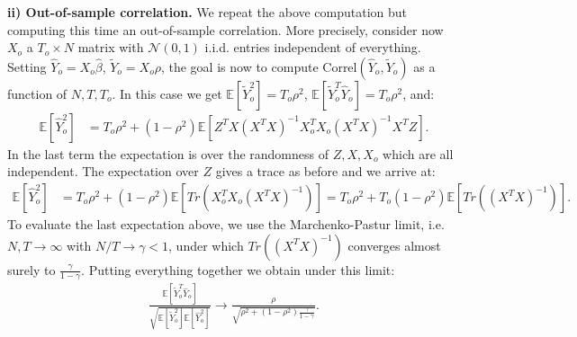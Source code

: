 \documentclass{article}
\begin{document}
\vspace{\baselineskip}
\noindent
\textbf{ii) Out-of-sample correlation.} We repeat the above computation but computing this time an out-of-sample correlation. More precisely, consider now $X_o$ a $T_o \times N$ matrix with $\mathcal{N}(0,1)$ i.i.d. entries independent of everything. Setting $\widehat Y_o = X_o \widehat \beta$, $\widetilde Y_o = X_o \rho$, the goal is now to compute $\text{Correl}(\widehat Y_o, \widetilde Y_o)$ as a function of $N, T, T_o$. In this case we get $\mathbb{E}[\widetilde Y_o^2] = T_o \rho^2$, $\mathbb{E}[\widetilde Y_o ^T \widehat Y_o] = T_o \rho^2$, and:
\begin{align*}
\mathbb{E}[ \widehat Y_o ^2] &= T_o \rho^2 + (1 - \rho^2)  \mathbb{E}[Z^T X (X^T X)^{-1} X^T_o X_o (X^T X)^{-1} X^T Z].
\end{align*}
In the last term the expectation is over the randomness of $Z, X, X_o$ which are all independent. The expectation over $Z$ gives a trace as before and we arrive at:
\begin{align*}
\mathbb{E}[ \widehat Y_o ^2] &= T_o \rho^2 + (1 - \rho^2)  \mathbb{E}[Tr(X^T_o X_o (X^T X)^{-1})] = T_o \rho^2 + T_o (1 - \rho^2)  \mathbb{E}[Tr((X^T X)^{-1})].
\end{align*}
To evaluate the last expectation above, we use the Marchenko-Pastur limit, i.e. $N, T \rightarrow \infty$ with $N/T \rightarrow \gamma < 1$, under which $Tr((X^T X)^{-1})$ converges almost surely to $\frac{\gamma}{1 - \gamma}$. Putting everything together we obtain under this limit:
\begin{align}\label{theo_correl_oos}
\frac{\mathbb{E}[\widetilde Y_o ^T \widehat Y_o]}{\sqrt{\mathbb{E}[ \widetilde Y_o ^2]  \mathbb{E}[ \widehat Y_o ^2]}} \rightarrow \frac{\rho}{\sqrt{\rho^2 + (1- \rho^2) \frac{\gamma}{1-\gamma}}}.
\end{align}
\end{document}
